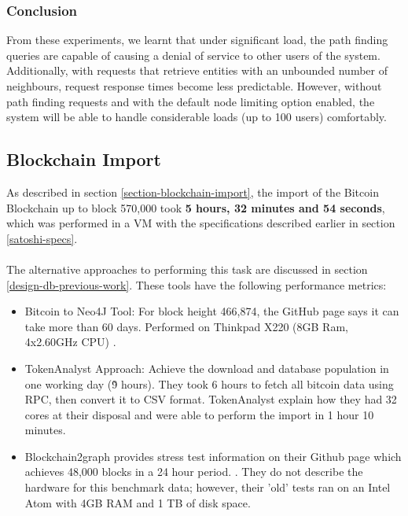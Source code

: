 \subsubsection{Conclusion}
From these experiments, we learnt that under significant load, the path finding queries are capable of causing a denial of service to other users of the system. Additionally, with requests that retrieve entities with an unbounded number of neighbours, request response times become less predictable. However, without path finding requests and with the default node limiting option enabled, the system will be able to handle considerable loads (up to 100 users) comfortably. 


\subsection{Blockchain Import}
As described in section \ref{section-blockchain-import}, the import of the Bitcoin Blockchain up to block 570,000 took \textbf{5 hours, 32 minutes and 54 seconds}, which was performed in a VM with the specifications described earlier in section \ref{satoshi-specs}.
\\\\
The alternative approaches to performing this task are discussed in section \ref{design-db-previous-work}. These tools have the following performance metrics:
\begin{itemize}
    \item Bitcoin to Neo4J Tool: For block height 466,874, the GitHub page says it can take more than 60 days. Performed on Thinkpad X220 (8GB Ram, 4x2.60GHz CPU) \cite{RefWorks:doc:5c98e031e4b068320632cef2}. 
    \item TokenAnalyst Approach: Achieve the download and database population in one working day (\~9 hours). They took 6 hours to fetch all bitcoin data using RPC, then convert it to CSV format. TokenAnalyst explain how they had 32 cores at their disposal and were able to perform the import in 1 hour 10 minutes. 
    \cite{RefWorks:doc:5c98e0cde4b044512c0b8641}
    \item Blockchain2graph provides stress test information on their Github page which achieves 48,000 blocks in a 24 hour period.  \cite{RefWorks:doc:5cac6184e4b01c076c63e173}. They do not describe the hardware for this benchmark data; however, their 'old' tests ran on an Intel Atom with 4GB RAM and 1 TB of disk space. 
\end{itemize}


